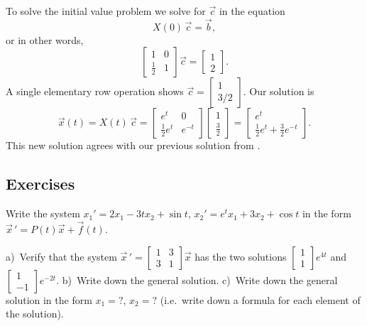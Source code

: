 \documentclass[12pt]{book}
\begin{document}
\begin{example}
To solve the initial value problem we solve for $\vec{c}$ in the equation
\begin{equation*}
X(0)\,\vec{c} = \vec{b} ,
\end{equation*}
or in other words,
\begin{equation*}
\begin{bmatrix}
1 & 0 \\
\frac{1}{2} & 1
\end{bmatrix} 
\vec{c} = 
\begin{bmatrix}
1 \\ 2
\end{bmatrix} .
\end{equation*}
A single elementary row operation shows
$\vec{c} =
\left[ \begin{smallmatrix} 1 \\ 3/2 \end{smallmatrix} \right]$.
Our solution is
\begin{equation*}
\vec{x}(t) = 
X(t)\,\vec{c} = 
\begin{bmatrix}
e^t & 0 \\
\frac{1}{2} e^t & e^{-t}
\end{bmatrix}
\begin{bmatrix}
1 \\ \frac{3}{2}
\end{bmatrix} =
\begin{bmatrix}
e^t \\
\frac{1}{2} e^t + \frac{3}{2} e^{-t}
\end{bmatrix} .
\end{equation*}
This new solution agrees with our previous solution from .
\end{example}

\subsection{Exercises}

\begin{exercise}
Write the system $x_1' = 2 x_1 - 3t x_2 + \sin t$,
$x_2' = e^t x_1 + 3 x_2 + \cos t$ in the form
${\vec{x}\,}' = P(t) \vec{x} + \vec{f}(t)$.
\end{exercise}

\begin{exercise}
a)~Verify that the system ${\vec{x}\,}' =
\left[ \begin{smallmatrix}
1 & 3 \\ 3 & 1
\end{smallmatrix} \right] \vec{x}$ has the two solutions
$\left[ \begin{smallmatrix}
1 \\ 1
\end{smallmatrix} \right] e^{4t}$ and
$\left[ \begin{smallmatrix}
1 \\ -1
\end{smallmatrix} \right] e^{-2t}$.
b)~Write down the general solution.
c)~Write down the general solution in the form $x_1 = ?$, $x_2 = ?$
(i.e.\ write down a formula for each element of the solution).
\end{exercise}
\end{document}
